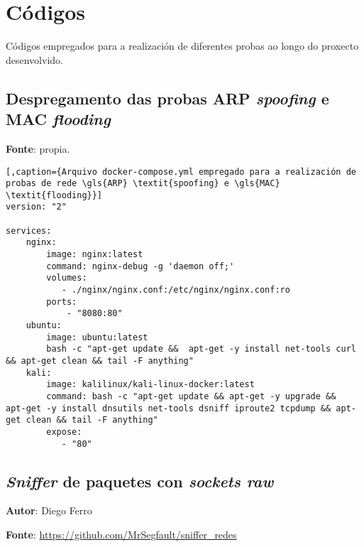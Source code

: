 \chapter{Códigos}
\minitoc
\clearpage

Códigos empregados para a realización de diferentes probas ao longo do proxecto desenvolvido.

\section{Despregamento das probas \gls{ARP} \textit{spoofing} e \gls{MAC} \textit{flooding}}
\label{codigo-arp-spoofing}

\textbf{Fonte}: propia.

\begin{lstlisting}[,caption={Arquivo docker-compose.yml empregado para a realización de probas de rede \gls{ARP} \textit{spoofing} e \gls{MAC} \textit{flooding}}]
version: "2"

services:
    nginx:
        image: nginx:latest
        command: nginx-debug -g 'daemon off;'
        volumes:
           - ./nginx/nginx.conf:/etc/nginx/nginx.conf:ro
        ports:
            - "8080:80"
    ubuntu:
        image: ubuntu:latest
        bash -c "apt-get update &&  apt-get -y install net-tools curl && apt-get clean && tail -F anything"
    kali:
        image: kalilinux/kali-linux-docker:latest
        command: bash -c "apt-get update && apt-get -y upgrade &&  apt-get -y install dnsutils net-tools dsniff iproute2 tcpdump && apt-get clean && tail -F anything"
        expose:
           - "80"
\end{lstlisting}

\section{\textit{Sniffer} de paquetes con \textit{sockets raw}}
\label{esnifador}

\textbf{Autor}: Diego Ferro

\textbf{Fonte}: \url{https://github.com/MrSegfault/sniffer\_redes}


